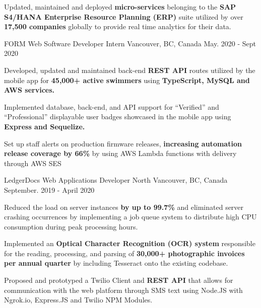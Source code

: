 \begin{cventries}
{\begin{cvitems}
       \item {Updated, maintained and deployed \textbf{micro-services} belonging to the \textbf{SAP S4/HANA Enterprise Resource Planning (ERP)} suite utilized by over \textbf{17,500 companies} globally to provide real time analytics for their data.}
      \end{cvitems}
    }    
 \cventry
    {FORM} %
    {Web Software Developer Intern} %
    {Vancouver, BC, Canada} %
    {May. 2020 - Sept 2020} %
    {
      \begin{cvitems} %
       \item {Developed, updated and maintained back-end \textbf{REST API} routes utilized by the mobile app for \textbf{45,000+ active swimmers} using \textbf{TypeScript, MySQL and AWS services.}}
       \item {Implemented database, back-end, and API support for ``Verified'' and ``Professional'' displayable user badges showcased in the mobile app using \textbf{ Express and Sequelize.}}
        \item {Set up staff alerts on production firmware releases, \textbf{increasing automation release coverage by 66\%} by using AWS Lambda functions with delivery through AWS SES}
      \end{cvitems}
    }    
\cventry
    {LedgerDocs}  %
    {Web Applications Developer} %
    {North Vancouver, BC, Canada} %
    {September. 2019 - April 2020} %
    {
      \begin{cvitems} %
       \item {Reduced the load on server instances \textbf{by up to 99.7\%} and eliminated server crashing occurrences by implementing a job queue system to distribute high CPU consumption during peak processing hours.}
        \item {Implemented an \textbf{Optical Character Recognition (OCR) system} responsible for the reading, processing, and parsing of \textbf{30,000+ photographic invoices per annual quarter} by including Tesseract onto the existing codebase.}
        \item {Proposed and prototyped a Twilio Client and \textbf{REST API} that allows for communication with the web platform through SMS text using Node.JS with Ngrok.io, Express.JS and Twilio NPM Modules.}
      \end{cvitems}
    }    
  
\end{cventries}
